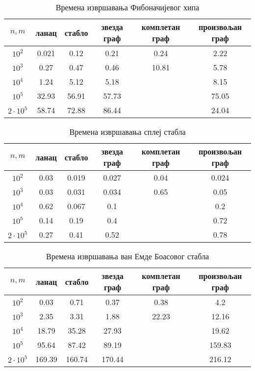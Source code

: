 \documentclass[11pt, a4paper]{article}
\theoremstyle{remark}
\numberwithin{equation}{section}
\begin{document}
	\begin{center}
	\begin{table}[H]
		\centering
		\caption{Времена извршавања Фибоначијевог хипа}
		\begin{tabular}{cccccc} \toprule
			$n, m$ & ланац & стабло & звезда граф & комплетан граф & произвољан граф\\ \midrule
			$10^2$ & 0.021 & 0.12 & 0.21 & 0.24 & 2.22\\ 
			$10^3$ & 0.27 & 0.47 & 0.46 & 10.81 & 5.78\\
			$10^4$ & 1.24 & 5.12 & 5.18 & & 8.15\\
			$10^5$ & 32.93 & 56.91 & 57.73 & & 75.05\\
			$2\cdot 10^5$ & 58.74 & 72.88 & 86.44 & & 24.04\\
			\bottomrule
		\end{tabular}
	\end{table}
	\end{center}
	\begin{center}
	\begin{table}[H]
		\centering
		\caption{Времена извршавања сплеј стабла}
		\begin{tabular}{cccccc} \toprule
			$n, m$ & ланац & стабло & звезда граф & комплетан граф & произвољан граф\\ \midrule
			$10^2$ & 0.03 & 0.019 & 0.027 & 0.04 & 0.024\\ 
			$10^3$ & 0.03 & 0.031 & 0.034 & 0.65 & 0.05\\
			$10^4$ & 0.62 & 0.067 & 0.1 & & 0.2\\
			$10^5$ & 0.14 & 0.19 & 0.4 & & 0.72\\
			$2\cdot 10^5$ & 0.27 & 0.41 & 0.52 & & 0.78\\
			\bottomrule
		\end{tabular}
	\end{table}
	\end{center}
	\begin{center}
	\begin{table}[H]
		\centering
		\caption{Времена извршавања ван Емде Боасовог стабла}
		\begin{tabular}{cccccc} \toprule 
			$n, m$ & ланац & стабло & звезда граф & комплетан граф & произвољан граф\\ \midrule
			$10^2$ & 0.03 & 0.71 & 0.37 & 0.38 & 4.2\\ 
			$10^3$ & 2.35 & 3.31 & 1.88 & 22.23 & 12.16\\
			$10^4$ & 18.79 & 35.28 & 27.93 & & 19.62\\
			$10^5$ & 95.64 & 87.42 & 89.19 & & 159.83\\
			$2\cdot 10^5$ & 169.39 & 160.74 & 170.44 & & 216.12\\
			\bottomrule
		\end{tabular}
		
	\end{table}
	\end{center}
\end{document}
